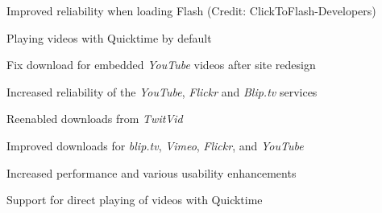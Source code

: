\begin{changelog}
\item Improved reliability when loading Flash (Credit: ClickToFlash-Developers)
\item Playing videos with Quicktime by default
\item Fix download for embedded \emph{YouTube} videos after site redesign
\end{changelog}

\begin{changelog}
\item Increased reliability of the \emph{YouTube}, \emph{Flickr} and \emph{Blip.tv} services
\item Reenabled downloads from \emph{TwitVid}
\end{changelog}

\begin{changelog}
\item Improved downloads for \emph{blip.tv}, \emph{Vimeo}, \emph{Flickr}, and \emph{YouTube}
\end{changelog}

\begin{changelog}
\item Increased performance and various usability enhancements
\item Support for direct playing of videos with Quicktime
\end{changelog}
